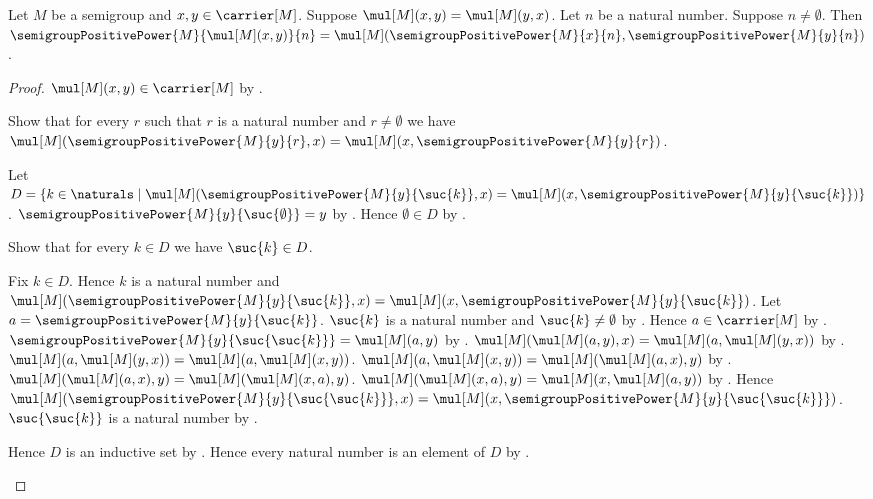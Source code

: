 \begin{theorem}\label{semigroup_positive_power_of_commuting_product}
    Let $M$ be a semigroup and $x,y\in\carrier[M]$.
    Suppose $\mul[M](x,y)=\mul[M](y,x)$.
    Let $n$ be a natural number.
    Suppose $n\neq\emptyset$.
    Then
        $\semigroupPositivePower{M}{\mul[M](x,y)}{n}
            =\mul[M](\semigroupPositivePower{M}{x}{n},
                \semigroupPositivePower{M}{y}{n})$.
\end{theorem}
\begin{proof}
    $\mul[M](x,y)\in\carrier[M]$ by .

    Show that for every $r$ such that $r$ is a natural number and
        $r\neq\emptyset$ we have
        $\mul[M](\semigroupPositivePower{M}{y}{r},x)
            =\mul[M](x,\semigroupPositivePower{M}{y}{r})$.
    \begin{subproof}
        Let $D=\{k\in\naturals\mid
            \text{$\mul[M](
                    \semigroupPositivePower{M}{y}{\suc{k}},x)
                =\mul[M](x,
                    \semigroupPositivePower{M}{y}{\suc{k}})$}\}$.
        $\semigroupPositivePower{M}{y}{\suc{\emptyset}}=y$ by
            .
        Hence $\emptyset\in D$ by .

        Show that for every $k\in D$ we have $\suc{k}\in D$.
        \begin{subproof}
            Fix $k\in D$.
            Hence $k$ is a natural number and
                $\mul[M](\semigroupPositivePower{M}{y}{\suc{k}},x)
                    =\mul[M](x,
                        \semigroupPositivePower{M}{y}{\suc{k}})$.
            Let $a=\semigroupPositivePower{M}{y}{\suc{k}}$.
            $\suc{k}$ is a natural number and $\suc{k}\neq\emptyset$ by
                .
            Hence $a\in\carrier[M]$ by
                .
            $\semigroupPositivePower{M}{y}{\suc{\suc{k}}}
                =\mul[M](a,y)$ by
                .
            $\mul[M](\mul[M](a,y),x)
                =\mul[M](a,\mul[M](y,x))$ by
                .
            $\mul[M](a,\mul[M](y,x))
                =\mul[M](a,\mul[M](x,y))$.
            $\mul[M](a,\mul[M](x,y))
                =\mul[M](\mul[M](a,x),y)$ by
                .
            $\mul[M](\mul[M](a,x),y)
                =\mul[M](\mul[M](x,a),y)$.
            $\mul[M](\mul[M](x,a),y)
                =\mul[M](x,\mul[M](a,y))$ by
                .
            Hence
                $\mul[M](
                    \semigroupPositivePower{M}{y}{\suc{\suc{k}}},x)
                =\mul[M](x,
                    \semigroupPositivePower{M}{y}{\suc{\suc{k}}})$.
            $\suc{\suc{k}}$ is a natural number by
                .
        \end{subproof}
        Hence $D$ is an inductive set by .
        Hence every natural number is an element of $D$ by
            .


\end{subproof}
\end{proof}
